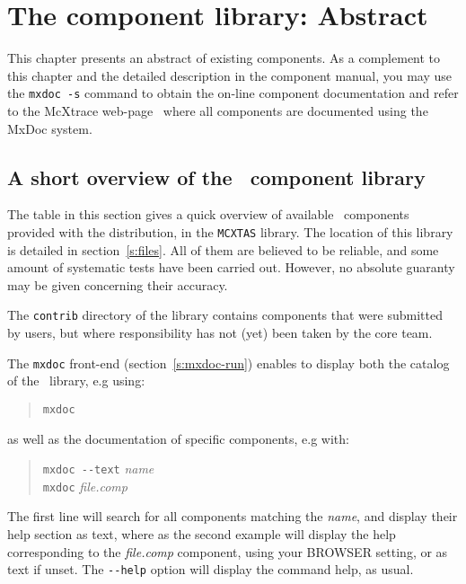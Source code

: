 \chapter{The component library: Abstract}
\label{s:components}

This chapter presents an abstract of existing components.
As a complement to this chapter and the
detailed description in the \MCX component manual,
you may use the \verb+mxdoc -s+ command to obtain the on-line
component documentation and refer to the McXtrace web-page~\cite{mcxtrace_webpage}
where all components are documented using the MxDoc system.

\section{A short overview of the \MCX\ component library}
\label{s:comp-overview}

The table in this section gives a quick overview of available \MCX\ components
provided with the distribution, in the \verb+MCXTAS+ library. The
location of this library is detailed in section~\ref{s:files}.
All of them are believed to be reliable, and some amount of systematic
tests have been carried out.
However, no absolute guaranty may be given concerning their accuracy.

The \verb+contrib+ directory of the library contains components
that were submitted by \MCX users,
but where responsibility has not (yet) been taken by the \MCX core team. 


The \verb+mxdoc+ front-end (section~\ref{s:mxdoc-run}) enables to display both the
catalog of the \MCX\ library, e.g using: 
\begin{quote}
  \verb|mxdoc|
\end{quote}
as well as the documentation of specific components, e.g with:
\begin{quote}
  \verb|mxdoc --text| \textit{name} \\
  \verb|mxdoc| \textit{file.comp}
\end{quote}
The first line will search for all components matching the \textit{name}, and display their help section as text, where as the second example will display the help corresponding to the \textit{file.comp} component, using your BROWSER setting, or as text if unset. The \verb+--help+ option will display the command help, as usual.

